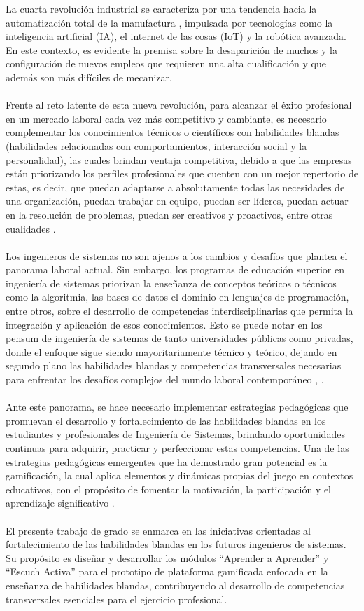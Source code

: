 La cuarta revolución industrial se caracteriza por una tendencia hacia la automatización total de la manufactura \cite{Perasso2016}, impulsada por tecnologías como la inteligencia artificial (IA), el internet de las cosas (IoT) y la robótica avanzada. En este contexto, es evidente la premisa sobre la desaparición de muchos y la configuración de nuevos empleos que requieren una alta cualificación y que además son más difíciles de mecanizar. 
\\ \\
Frente al reto latente de esta nueva revolución, para alcanzar el éxito profesional en un mercado laboral cada vez más competitivo y cambiante, es necesario complementar los conocimientos técnicos o científicos con habilidades blandas (habilidades relacionadas con comportamientos, interacción social y la personalidad), las cuales brindan ventaja competitiva, debido a que las empresas están priorizando los perfiles profesionales que cuenten con un mejor repertorio de estas, es decir, que puedan adaptarse a absolutamente todas las necesidades de una organización, puedan trabajar en equipo, puedan ser líderes,  puedan actuar en la resolución de problemas,  puedan ser creativos y proactivos, entre otras cualidades \cite{GonzalezMolina2021}.
\\ \\
Los ingenieros de sistemas no son ajenos a los cambios y desafíos que plantea el panorama laboral actual. Sin embargo, los programas de educación superior en ingeniería de sistemas priorizan la enseñanza de conceptos teóricos o técnicos como la algoritmia, las bases de datos el dominio en lenguajes de programación, entre otros, sobre el desarrollo de competencias interdisciplinarias que permita la integración y aplicación de esos conocimientos. Esto se puede notar en los pensum de ingeniería de sistemas de tanto universidades públicas como privadas, donde el enfoque sigue siendo mayoritariamente técnico y teórico, dejando en segundo plano las habilidades blandas y competencias transversales necesarias para enfrentar los desafíos complejos del mundo laboral contemporáneo \cite{javeriana2021}, \cite{unal2024}.
\\ \\
Ante este panorama, se hace necesario implementar estrategias pedagógicas que promuevan el desarrollo y fortalecimiento de las habilidades blandas en los estudiantes y profesionales de Ingeniería de Sistemas, brindando oportunidades continuas para adquirir, practicar y perfeccionar estas competencias. Una de las estrategias pedagógicas emergentes que ha demostrado gran potencial es la gamificación, la cual aplica elementos y dinámicas propias del juego en contextos educativos, con el propósito de fomentar la motivación, la participación y el aprendizaje significativo \cite{LozadaAvila2017}.
\\ \\
El presente trabajo de grado se enmarca en las iniciativas orientadas al fortalecimiento de las habilidades blandas en los futuros ingenieros de sistemas. Su propósito es diseñar y desarrollar los módulos “Aprender a Aprender” y “Escuch Activa” para el prototipo de plataforma gamificada enfocada en la enseñanza de habilidades blandas, contribuyendo al desarrollo de competencias transversales esenciales para el ejercicio profesional.
\newpage